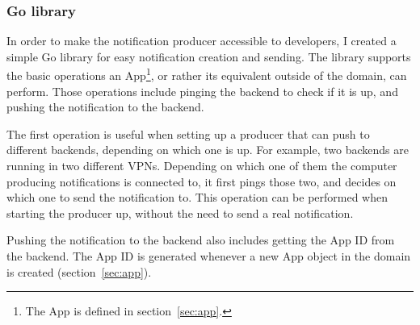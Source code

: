 \subsubsection{Go library}\label{sec:producer-go-library}

In order to make the notification producer
accessible to developers,
I created a simple Go library
for easy notification creation and sending.
The library supports the basic operations
an App\footnote{
  The App is defined in section~\ref{sec:app}.
}, or rather its equivalent outside of the domain,
can perform.
Those operations include pinging
the backend to check if it is up,
and pushing the notification to the backend.

The first operation is useful when setting up
a producer that can push to different backends,
depending on which one is up.
For example,
two backends are running
in two different VPNs.
Depending on which one of them
the computer producing notifications
is connected to,
it first pings those two,
and decides on which one to send the notification to.
This operation can be performed
when starting the producer up,
without the need to send a real notification.

Pushing the notification to the backend
also includes getting the App \ac{ID} from the backend.
The App \ac{ID} is generated whenever
a new App object in the domain is created
(section~\ref{sec:app}).
